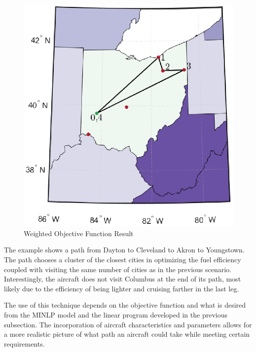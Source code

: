 \begin{figure}[h]
    \centering
    \includegraphics{Thesis/Method_II/fmin3000_negF.eps}
    \caption{Weighted Objective Function Result}
    \label{fig:weightedObj}
\end{figure}
The example shows a path from Dayton to Cleveland to Akron to Youngstown. The path chooses a cluster of the closest cities in optimizing the fuel efficiency coupled with visiting the same number of cities as in the previous scenario. Interestingly, the aircraft does not visit Columbus at the end of its path, most likely due to the efficiency of being lighter and cruising farther in the last leg.\par
The use of this technique depends on the objective function and what is desired from the MINLP model and the linear program developed in the previous subsection. The incorporation of aircraft characteristics and parameters allows for a more realistic picture of what path an aircraft could take while meeting certain requirements. 



